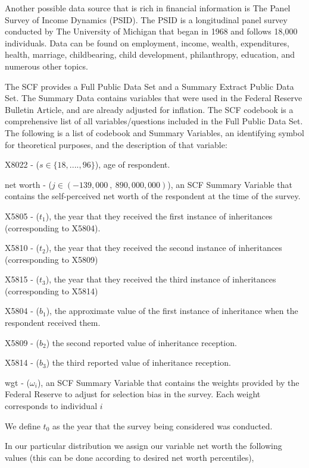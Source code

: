 \documentclass[letterpaper,12pt]{article}
\theoremstyle{definition}
\begin{document}
\begin{spacing}{1.5}
Another possible data source that is rich in financial information is The Panel Survey of Income Dynamics (PSID). The PSID is a longitudinal panel survey conducted by The University of Michigan that began in 1968 and follows 18,000 individuals. Data can be found on employment, income, wealth, expenditures, health, marriage, childbearing, child development, philanthropy, education, and numerous other topics. \citet{UMich}

The SCF provides a Full Public Data Set and a Summary Extract Public Data Set. The Summary Data contains variables that were used in the Federal Reserve Bulletin Article, and are already adjusted for inflation. The SCF codebook is a comprehensive list of all variables/questions included in the Full Public Data Set.   The following is a list of codebook and Summary Variables, an identifying symbol for theoretical purposes, and the description of that variable:

  X8022 - ($s \in \{18,....,96\}$), age of respondent.

  net worth - ($j\in (-139,000~,~890,000,000)$), an SCF Summary Variable that contains the self-perceived net worth of the respondent at the time of the survey.

  X5805 - ($t_1$), the year that they received the first instance of inheritances (corresponding to X5804).

  X5810 - ($t_2$), the year that they received the second instance of inheritances (corresponding to X5809)

  X5815 - ($t_3$), the year that they received the third instance of inheritances (corresponding to X5814)

  X5804 - ($b_{1}$), the approximate value of the first instance of inheritance when the respondent received them.

  X5809 - ($b_{2}$) the second reported value of inheritance reception.

  X5814 - ($b_{3}$) the third reported value of inheritance reception.
  
  wgt - ($\omega_i$), an SCF Summary Variable that contains the weights provided by the Federal Reserve to adjust for selection bias in the survey. Each weight corresponds to individual $i$

  We define $t_0$ as the year that the survey being considered was conducted.

  In our particular distribution we assign our variable net worth the following values (this can be done according to desired net worth percentiles),



\end{spacing}
\end{document}

